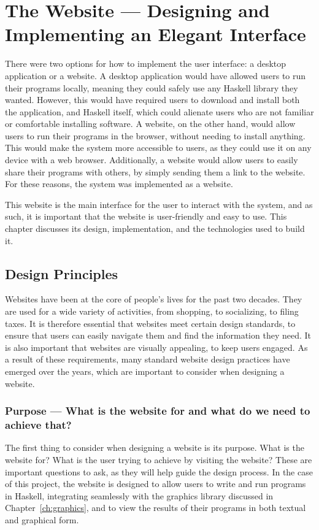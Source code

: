 \documentclass[../main.tex]{subfiles}
\begin{document}
\chapter{The Website — Designing and Implementing an Elegant Interface} \label{ch:website}
    There were two options for how to implement the user interface: a desktop
        application or a website.
    A desktop application would have allowed users to run their programs locally,
        meaning they could safely use any Haskell library they wanted.
    However, this would have required users to download and install both the
        application, and Haskell itself, which could alienate users who are not
        familiar or comfortable installing software.
    A website, on the other hand, would allow users to run their programs in the
        browser, without needing to install anything.
    This would make the system more accessible to users, as they could use it on
        any device with a web browser.
    Additionally, a website would allow users to easily share their programs with
        others, by simply sending them a link to the website.
    For these reasons, the system was implemented as a website.

    This website is the main interface for the user to interact with the system,
        and as such, it is important that the website is user-friendly and easy to use.
    This chapter discusses its design, implementation, and the technologies used to
        build it.

    \section{Design Principles}
        Websites have been at the core of people's lives for the past two decades.
        They are used for a wide variety of activities, from shopping, to socializing,
            to filing taxes.
        It is therefore essential that websites meet certain design standards, to
            ensure that users can easily navigate them and find the information they need.
        It is also important that websites are visually appealing, to keep users
            engaged.
        As a result of these requirements, many standard website design practices have
            emerged over the years, which are important to consider when designing a
            website.

        \subsection{Purpose — What is the website for and what do we need to achieve that?}
            The first thing to consider when designing a website is its purpose.
            What is the website for?
            What is the user trying to achieve by visiting the website?
            These are important questions to ask, as they will help guide the design
                process.
            In the case of this project, the website is designed to allow users to write
                and run programs in Haskell, integrating seamlessly with the graphics library
                discussed in Chapter~\ref{ch:graphics}, and to view the results of their
                programs in both textual and graphical form.
\end{document}
